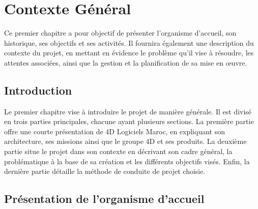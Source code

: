 
\chapter{Contexte Général}
\pagestyle{chapterstyle}
Ce premier chapitre a pour objectif de présenter
l’organisme d’accueil, son historique, ses objectifs
et ses activités. Il fournira également une 
description du contexte du projet, en mettant
en évidence le problème qu’il vise à résoudre, 
les attentes associées, ainsi que la gestion et 
la planification de sa mise en œuvre.



\newpage
\vspace{1cm}
\section{Introduction}


Le premier chapitre vise à introduire le projet de manière générale. 
Il est divisé en trois parties principales, chacune ayant 
plusieurs sections. La première partie offre une courte présentation 
de 4D Logiciels Maroc, en expliquant son architecture, ses missions 
ainsi que le groupe 4D et ses produits. La deuxième partie situe 
le projet dans son contexte en décrivant son cadre général, 
la problématique à la base de sa création et les différents 
objectifs visés. Enfin, la dernière partie détaille la méthode 
de conduite de projet choisie.



\section{Présentation de l’organisme d’accueil}

